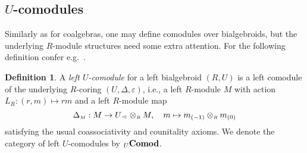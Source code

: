 \documentclass[reqno, a4paper, 10pt]{amsart}
\numberwithin{equation}{section}
\theoremstyle{plain}
\theoremstyle{definition}
\newtheorem{dfn}[theorem]{Definition}
\theoremstyle{remark}
\begin{document}
\subsection{$U$-comodules}

Similarly as for coalgebras, one may
define comodules over 
bialgebroids, but the underlying
$R$-module structures need some extra
attention. For the following definition
confer e.g.\
\cite{Schau:BONCRAASTFHB,Boe:GTFHA,
BrzWis:CAC}.

\begin{dfn}
\label{tempo}
A {\em left $U$-comodule} for a left bialgebroid $(R, U)$ 
is a left comodule of the underlying $R$-coring $(U, {\Delta},
\varepsilon)$, 
i.e., a left $R$-module $M$ with action $L_{{\scriptscriptstyle{R}}}: (r,m) \mapsto rm$ and a
left $R$-module map  
\begin{equation*}
		  {\Delta}_{{\scriptscriptstyle{M}}}: 
		  M \to U_{{\,\raise1pt\hbox{$\scriptscriptstyle{\lhd}$} \, }} \otimes_{{\scriptscriptstyle{R}}} M, 
		  \quad 
		  m \mapsto m_{(-1)} \otimes_{{\scriptscriptstyle{R}}} m_{(0)}
\end{equation*}
satisfying the usual coassociativity and
 counitality axioms. We denote the category of left
 $U$-comodules 
by ${}_U\bf Comod$.
\end{dfn}
\end{document}
